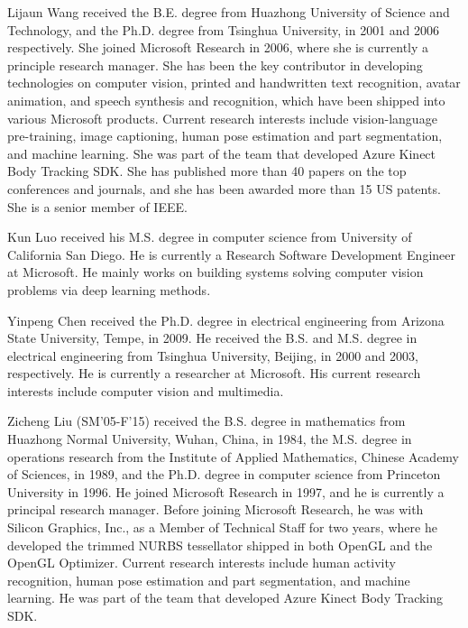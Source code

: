 \documentclass[final]{IEEEtran}
\begin{document}
{\begin{minipage}{\textwidth}
\begin{IEEEbiography}{Lijaun Wang} received the B.E. degree from Huazhong University of Science and Technology, and the Ph.D. degree from Tsinghua University, in 2001 and 2006 respectively. She joined Microsoft Research in 2006, where she is currently a principle research manager. She has been the key contributor in developing technologies on computer vision, printed and handwritten text recognition, avatar animation, and speech synthesis and recognition, which have been shipped into various Microsoft products. Current research interests include vision-language pre-training, image captioning, human pose estimation and part segmentation, and machine learning. She was part of the team that developed Azure Kinect Body Tracking SDK. She has published more than 40 papers on the top conferences and journals, and she has been awarded more than 15 US patents. She is a senior member of IEEE.
\end{IEEEbiography}

\begin{IEEEbiography}{Kun Luo} received his M.S. degree in computer science from University of California San Diego. He is currently a Research Software Development Engineer at Microsoft. He mainly works on building systems solving computer vision problems via deep learning methods. 
\end{IEEEbiography}

\begin{IEEEbiography}{Yinpeng Chen} received the Ph.D. degree in electrical engineering from Arizona State University, Tempe, in 2009. He received the B.S. and M.S. degree in electrical engineering from Tsinghua University, Beijing, in 2000 and 2003, respectively. He is currently a researcher at Microsoft. His current research interests include computer vision and multimedia. 
\end{IEEEbiography}


\begin{IEEEbiography}{Zicheng Liu} (SM'05-F'15) received the B.S. degree in mathematics from Huazhong Normal University, Wuhan, China, in 1984, the M.S. degree in operations research from the Institute of Applied Mathematics, Chinese Academy of Sciences, in 1989, and the Ph.D. degree in computer science from Princeton University in 1996. He joined Microsoft Research in 1997, and he is currently a principal research manager. Before joining Microsoft Research, he was with Silicon Graphics, Inc., as a Member of Technical Staff for two years, where he developed the trimmed NURBS tessellator shipped in both OpenGL and the OpenGL Optimizer. Current research interests include human activity recognition, human pose estimation and part segmentation, and machine learning. He was part of the team that developed Azure Kinect Body Tracking SDK. 


\end{IEEEbiography}
\end{minipage}}
\end{document}
